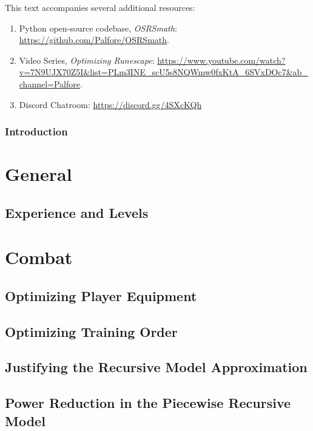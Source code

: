 \documentclass[10pt,a4paper]{report}
\begin{document}
	
	\tableofcontents
	\newpage

This text accompanies several additional resources:
\begin{enumerate}
	\item Python open-source codebase, \textit{OSRSmath}: \url{https://github.com/Palfore/OSRSmath}.
	\item Video Series, \textit{Optimizing Runescape}: \url{https://www.youtube.com/watch?v=7N9UJX70Z5I&list=PLm3INE_scU5s8NQWmw0fxKtA_6SVxDOc7&ab_channel=Palfore}.
	\item Discord Chatroom: \url{https://discord.gg/4SXcKQh}
\end{enumerate}

\newpage
	\section*{Introduction}
		
	
	\part{General}
		\chapter{Experience and Levels}\label{chp:experience_and_levels}
			

	\part{Combat}
		
		
		
		
		\chapter{Optimizing Player Equipment}
			
		\chapter{Optimizing Training Order}
			
		
		\begin{appendices}
			\chapter{Justifying the Recursive Model Approximation}\label{combat-app:recursive_justification}
				
			\chapter{Power Reduction in the Piecewise Recursive Model}\label{combat-app:power_reduction}
				
		\end{appendices}
\end{document}
